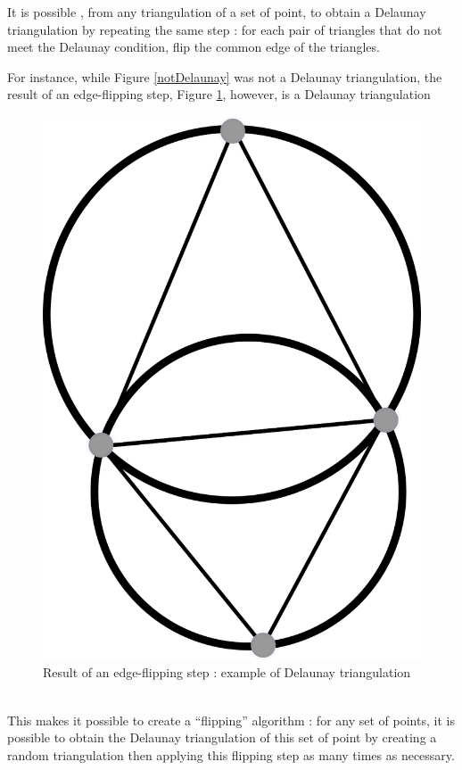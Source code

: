 \documentclass[a4paper,10pt]{article}
\begin{document}
It is possible , from any triangulation of a set of point, to obtain a Delaunay triangulation by repeating the same step : for each pair of triangles that do not meet the Delaunay condition, flip the common edge of the triangles.

For instance, while Figure \ref{notDelaunay} was not a Delaunay triangulation, the result of an edge-flipping step, Figure \ref{DelaunayTriangulation}, however, is a Delaunay triangulation
\begin{figure}[h]
\centering

\caption{\label{DelaunayTriangulation} Result of an edge-flipping step : example of Delaunay triangulation}
\includegraphics[scale=1]{dessin1}
\end{figure}\\
This makes it possible to create a ``flipping'' algorithm : for any set of points, it is possible to obtain the Delaunay triangulation of this set of point by creating a random triangulation then applying this flipping step as many times as necessary.
\end{document}
